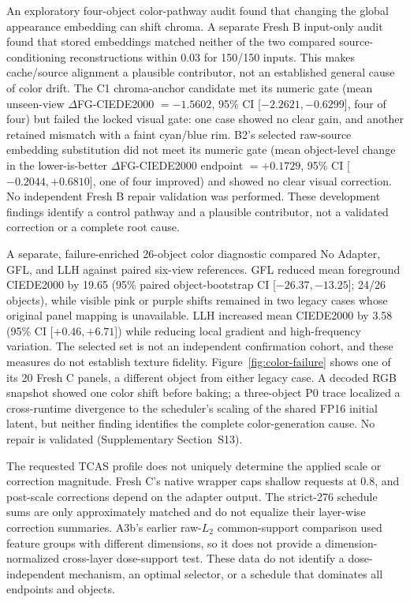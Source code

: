 \documentclass[times,twocolumn,final]{elsarticle}
\begin{document}
An exploratory four-object color-pathway audit found that changing the global appearance embedding can shift chroma. A separate Fresh B input-only audit found that stored embeddings matched neither of the two compared source-conditioning reconstructions within 0.03 for 150/150 inputs. This makes cache/source alignment a plausible contributor, not an established general cause of color drift. The C1 chroma-anchor candidate met its numeric gate (mean unseen-view $\Delta$FG-CIEDE2000 $=-1.5602$, 95\% CI [$-2.2621,-0.6299$], four of four) but failed the locked visual gate: one case showed no clear gain, and another retained mismatch with a faint cyan/blue rim. B2's selected raw-source embedding substitution did not meet its numeric gate (mean object-level change in the lower-is-better $\Delta$FG-CIEDE2000 endpoint $=+0.1729$, 95\% CI [$-0.2044,+0.6810$], one of four improved) and showed no clear visual correction. No independent Fresh B repair validation was performed. These development findings identify a control pathway and a plausible contributor, not a validated correction or a complete root cause.

A separate, failure-enriched 26-object color diagnostic compared No Adapter, GFL, and LLH against paired six-view references. GFL reduced mean foreground CIEDE2000 by 19.65 (95\% paired object-bootstrap CI [$-26.37,-13.25$]; 24/26 objects), while visible pink or purple shifts remained in two legacy cases whose original panel mapping is unavailable. LLH increased mean CIEDE2000 by 3.58 (95\% CI [$+0.46,+6.71$]) while reducing local gradient and high-frequency variation. The selected set is not an independent confirmation cohort, and these measures do not establish texture fidelity. Figure~\ref{fig:color-failure} shows one of its 20 Fresh C panels, a different object from either legacy case. A decoded RGB snapshot showed one color shift before baking; a three-object P0 trace localized a cross-runtime divergence to the scheduler's scaling of the shared FP16 initial latent, but neither finding identifies the complete color-generation cause. No repair is validated (Supplementary Section~S13).

The requested TCAS profile does not uniquely determine the applied scale or correction magnitude. Fresh C's native wrapper caps shallow requests at 0.8, and post-scale corrections depend on the adapter output. The strict-276 schedule sums are only approximately matched and do not equalize their layer-wise correction summaries. A3b's earlier raw-$L_2$ common-support comparison used feature groups with different dimensions, so it does not provide a dimension-normalized cross-layer dose-support test. These data do not identify a dose-independent mechanism, an optimal selector, or a schedule that dominates all endpoints and objects.
\end{document}
